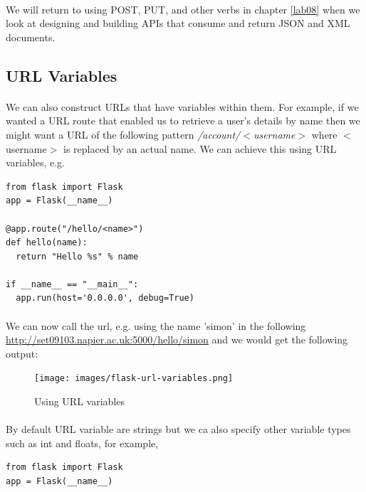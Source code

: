 \documentclass[12pt, a4paper, oneside]{book}
\begin{document}
{\paragraph{} We will return to using POST, PUT, and other verbs in chapter \ref{lab08} when we look at designing and building APIs that consume and return JSON and XML documents.


\subsection{URL Variables}
\label{url-variables}
\paragraph{} We can also construct URLs that have variables within them. For example, if we wanted a URL route that enabled us to retrieve a user's details by name then we might want a URL of the following pattern \emph{/account/$<$username$>$} where $<$username$>$ is replaced by an actual name. We can achieve this using URL variables, e.g.

\begin{lstlisting}
from flask import Flask
app = Flask(__name__)

@app.route("/hello/<name>")
def hello(name):
  return "Hello %s" % name

if __name__ == "__main__":
  app.run(host='0.0.0.0', debug=True)
\end{lstlisting}

\paragraph{} We can now call the url, e.g. using the name 'simon' in the following \url{http://set09103.napier.ac.uk:5000/hello/simon} and we would get the following output:

\begin{figure}[H]
\centering
\texttt{[image: images/flask-url-variables.png]}
\caption{Using URL variables}
\label{fig:flask-url-variables}
\end{figure}

\paragraph{} By default URL variable are strings but we ca also specify other variable types such as int and floats, for example,

\begin{lstlisting}
from flask import Flask
app = Flask(__name__)


\end{lstlisting}}
\end{document}
